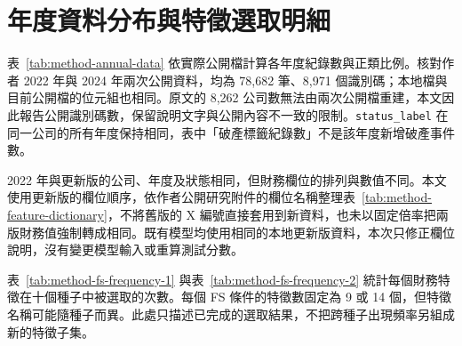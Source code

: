 \section{年度資料分布與特徵選取明細}\label{sec:appendix-data-fs}

表~\ref{tab:method-annual-data} 依實際公開檔計算各年度紀錄數與正類比例。核對作者 2022 年與 2024 年兩次公開資料，均為 78,682 筆、8,971 個識別碼；本地檔與目前公開檔的位元組也相同。原文的 8,262 公司數無法由兩次公開檔重建，本文因此報告公開識別碼數，保留說明文字與公開內容不一致的限制。\nolinkurl{status_label} 在同一公司的所有年度保持相同，表中「破產標籤紀錄數」不是該年度新增破產事件數。

2022 年與更新版的公司、年度及狀態相同，但財務欄位的排列與數值不同。本文使用更新版的欄位順序，依作者公開研究附件的欄位名稱整理表~\ref{tab:method-feature-dictionary}，不將舊版的 X 編號直接套用到新資料，也未以固定倍率把兩版財務值強制轉成相同。既有模型均使用相同的本地更新版資料，本次只修正欄位說明，沒有變更模型輸入或重算測試分數。



表~\ref{tab:method-fs-frequency-1} 與表~\ref{tab:method-fs-frequency-2} 統計每個財務特徵在十個種子中被選取的次數。每個 FS 條件的特徵數固定為 9 或 14 個，但特徵名稱可能隨種子而異。此處只描述已完成的選取結果，不把跨種子出現頻率另組成新的特徵子集。



\endgroup
